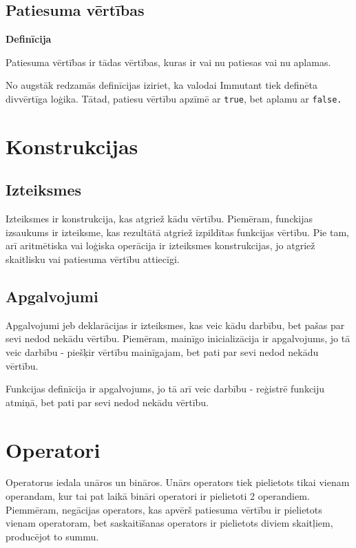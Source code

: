 \documentclass[12pt,a4paper]{report}
\begin{document}
\subsection{Patiesuma vērtības}

\textbf{Definīcija}

Patiesuma vērtības ir tādas vērtības, kuras ir vai nu patiesas vai nu aplamas.

No augstāk redzamās definīcijas iziriet, ka valodai Immutant tiek definēta divvērtīga loģika. Tātad, patiesu vērtību apzīmē ar \texttt{true}, bet aplamu ar \texttt{false.}

\section{Konstrukcijas}

\subsection{Izteiksmes}

Izteiksmes ir konstrukcija, kas atgriež kādu vērtību. Piemēram, funckijas izsaukums ir izteiksme, kas rezultātā atgriež izpildītas funkcijas vērtību. Pie tam, arī aritmētiska vai loģiska operācija ir izteiksmes konstrukcijas, jo atgriež skaitlisku vai patiesuma vērtību attiecīgi.

\subsection{Apgalvojumi}

Apgalvojumi jeb deklarācijas ir izteiksmes, kas veic kādu darbību, bet pašas par sevi nedod nekādu vērtību. Piemēram, mainīgo inicializācija ir apgalvojums, jo tā veic darbību - piešķir vērtību mainīgajam, bet pati par sevi nedod nekādu vērtību.

Funkcijas definīcija ir apgalvojums, jo tā arī veic darbību - reģistrē funkciju atmiņā, bet pati par sevi nedod nekādu vērtību.

\section{Operatori}
\label{section:operators}

Operatorus iedala unāros un bināros. Unārs operators tiek pielietots tikai vienam operandam, kur tai pat laikā bināri operatori ir pielietoti 2 operandiem. Piemmēram, negācijas operators, kas apvērš patiesuma vērtību ir pielietots vienam operatoram, bet saskaitīšanas operators ir pielietots diviem skaitļiem, producējot to summu.
\end{document}
